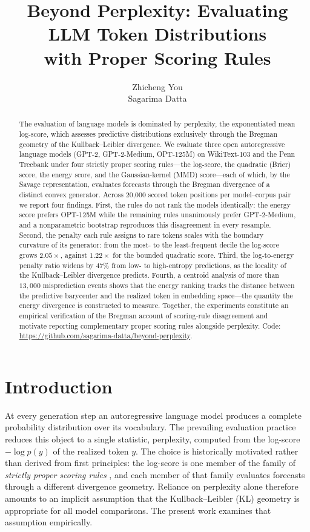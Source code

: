 \documentclass{article}
\title{Beyond Perplexity: Evaluating LLM Token Distributions\\with Proper Scoring Rules}
\author{%
  Zhicheng You \\
  \And
  Sagarima Datta \\
}
\begin{document}
\maketitle

\begin{abstract}
  The evaluation of language models is dominated by perplexity, the exponentiated mean
  log-score, which assesses predictive distributions exclusively through the Bregman
  geometry of the Kullback--Leibler divergence. We evaluate three open autoregressive
  language models (GPT-2, GPT-2-Medium, OPT-125M) on WikiText-103 and the Penn Treebank
  under four strictly proper scoring rules---the log-score, the quadratic (Brier) score,
  the energy score, and the Gaussian-kernel (MMD) score---each of which, by the Savage
  representation, evaluates forecasts through the Bregman divergence of a distinct convex
  generator. Across 20{,}000 scored token positions per model--corpus pair we report four
  findings. First, the rules do not rank the models identically: the energy score prefers
  OPT-125M while the remaining rules unanimously prefer GPT-2-Medium, and a nonparametric
  bootstrap reproduces this disagreement in every resample. Second, the penalty each rule
  assigns to rare tokens scales with the boundary curvature of its generator: from the
  most- to the least-frequent decile the log-score grows $2.05\times$, against
  $1.22\times$ for the bounded quadratic score. Third, the log-to-energy penalty ratio
  widens by $47\%$ from low- to high-entropy predictions, as the locality of the
  Kullback--Leibler divergence predicts. Fourth, a centroid analysis of more than
  $13{,}000$ misprediction events shows that the energy ranking tracks the distance
  between the predictive barycenter and the realized token in embedding space---the
  quantity the energy divergence is constructed to measure. Together, the experiments
  constitute an empirical verification of the Bregman account of scoring-rule
  disagreement and motivate reporting complementary proper scoring rules alongside
  perplexity. Code: \url{https://github.com/sagarima-datta/beyond-perplexity}.
\end{abstract}

\section{Introduction}

At every generation step an autoregressive language model produces a complete probability
distribution over its vocabulary. The prevailing evaluation practice reduces this object
to a single statistic, perplexity, computed from the log-score $-\log p(y)$ of the
realized token $y$. The choice is historically motivated \citep{jelinek1977} rather than
derived from first principles: the log-score is one member of the family of
\emph{strictly proper scoring rules} \citep{gneiting2007}, and each member of that
family evaluates forecasts through a different divergence geometry. Reliance on
perplexity alone therefore amounts to an implicit assumption that the Kullback--Leibler
(KL) geometry is appropriate for all model comparisons. The present work examines that
assumption empirically.
\end{document}
